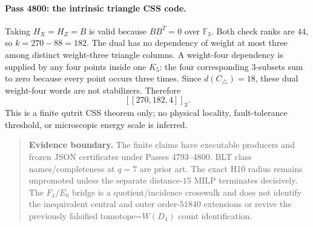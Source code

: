 \paragraph{Pass 4800: the intrinsic triangle CSS code.}
Taking $H_X=H_Z=B$ is valid because $BB^T=0$ over $\mathbb F_3$.  Both check ranks are $44$, so $k=270-88=182$.  The dual has no dependency of weight at most three among distinct weight-three triangle columns.  A weight-four dependency is supplied by any four points inside one $K_5$: the four corresponding $3$-subsets sum to zero because every point occurs three times.  Since $d(C_\triangle)=18$, these dual weight-four words are not stabilizers.  Therefore
\[
 \boxed{[[270,182,4]]_3}.
\]
This is a finite qutrit CSS theorem only; no physical locality, fault-tolerance threshold, or microscopic energy scale is inferred.

\begin{quote}\small
\textbf{Evidence boundary.}  The finite claims have executable producers and frozen JSON certificates under Passes 4793--4800.  BLT class names/completeness at $q=7$ are prior art.  The exact H10 radius remains unpromoted unless the separate distance-$15$ MILP terminates decisively.  The $F_4/E_6$ bridge is a quotient/incidence crosswalk and does not identify the inequivalent central and outer order-$51840$ extensions or revive the previously falsified tomotope=$W(D_4)$ count identification.
\end{quote}
